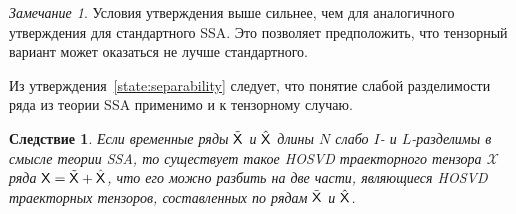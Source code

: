 \documentclass[specialist,
    substylefile = spbu_report.rtx,
    subf,href,colorlinks=true, 12pt]{disser}
\theoremstyle{plain}
\newtheorem{corollary}{Следствие}[statement]
\theoremstyle{definition}
\theoremstyle{remark}
\newtheorem*{remark}{Замечание}
\begin{document}
    \begin{remark}
        Условия утверждения выше сильнее, чем для аналогичного утверждения для стандартного SSA.
        Это позволяет предположить, что тензорный вариант может оказаться не лучше стандартного.
    \end{remark}

    Из утверждения~\ref{state:separability} следует, что понятие слабой разделимости ряда из теории SSA
    применимо и к тензорному случаю.
    \begin{corollary}
        Если временные ряды $\tilde{\mathsf{X}}$ и $\hat{\mathsf{X}}$ длины $N$ слабо $I$- и $L$-разделимы в смысле теории \emph{SSA},
        то существует такое \emph{HOSVD} траекторного тензора $\mathcal{X}$ ряда $\mathsf{X}=\tilde{\mathsf{X}} + \hat{\mathsf{X}}$, что его можно разбить
        на две части, являющиеся \emph{HOSVD} траекторных тензоров, составленных по рядам $\tilde{\mathsf{X}}$ и $\hat{\mathsf{X}}$.
    \end{corollary}
\end{document}
